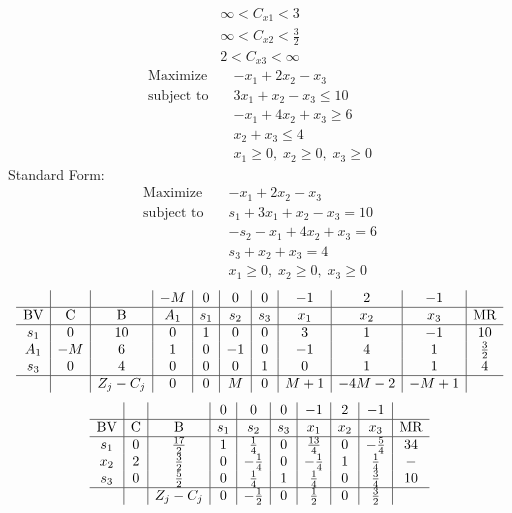 \documentclass{article}
\begin{document}
\begin{align*}
\infty<C_{x1}<3\end{align*}
\begin{align*}
\infty<C_{x2}<\frac{3}{2}\end{align*}
\begin{align*}
2<C_{x3}<\infty\end{align*}
\begin{align*}
\text{Maximize} \quad & -x_{1} + 2x_{2} - x_{3}\\
\text{subject to} \quad
& 3x_{1} + x_{2} - x_{3}\le10\\
& -x_{1} + 4x_{2} + x_{3}\ge6\\
& x_{2} + x_{3}\le4\\
& x_{1}\ge0,\; x_{2}\ge0,\; x_{3}\ge0\end{align*}
Standard Form:\\
\begin{align*}
\text{Maximize} \quad & -x_{1} + 2x_{2} - x_{3}\\
\text{subject to} \quad
& s_{1} + 3x_{1} + x_{2} - x_{3}=10\\
& -s_{2} - x_{1} + 4x_{2} + x_{3}=6\\
& s_{3} + x_{2} + x_{3}=4\\
& x_{1}\ge0,\; x_{2}\ge0,\; x_{3}\ge0\end{align*}
\begin{align*}
\begin{array}{c|c|c|c|c|c|c|c|c|c|c}
 &  &  & -M & 0 & 0 & 0 & -1 & 2 & -1 & \\
\hline
\text{BV} & \text{C} & \text{B} & A_{1} & s_{1} & s_{2} & s_{3} & x_{1} & x_{2} & x_{3} & \text{MR} \\
\hline
s_{1} & 0 & 10 & 0 & 1 & 0 & 0 & 3 & 1 & -1 & 10 \\
A_{1} & -M & 6 & 1 & 0 & -1 & 0 & -1 & 4 & 1 & \frac{3}{2} \\
s_{3} & 0 & 4 & 0 & 0 & 0 & 1 & 0 & 1 & 1 & 4 \\
\hline
 &  & Z_j-C_j & 0 & 0 & M & 0 & M + 1 & -4M - 2 & -M + 1 & \\
\end{array}
\end{align*}
\begin{align*}
\begin{array}{c|c|c|c|c|c|c|c|c|c}
 &  &  & 0 & 0 & 0 & -1 & 2 & -1 & \\
\hline
\text{BV} & \text{C} & \text{B} & s_{1} & s_{2} & s_{3} & x_{1} & x_{2} & x_{3} & \text{MR} \\
\hline
s_{1} & 0 & \frac{17}{2} & 1 & \frac{1}{4} & 0 & \frac{13}{4} & 0 & -\frac{5}{4} & 34 \\
x_{2} & 2 & \frac{3}{2} & 0 & -\frac{1}{4} & 0 & -\frac{1}{4} & 1 & \frac{1}{4} & - \\
s_{3} & 0 & \frac{5}{2} & 0 & \frac{1}{4} & 1 & \frac{1}{4} & 0 & \frac{3}{4} & 10 \\
\hline
 &  & Z_j-C_j & 0 & -\frac{1}{2} & 0 & \frac{1}{2} & 0 & \frac{3}{2} & \\
\end{array}
\end{align*}
\end{document}
